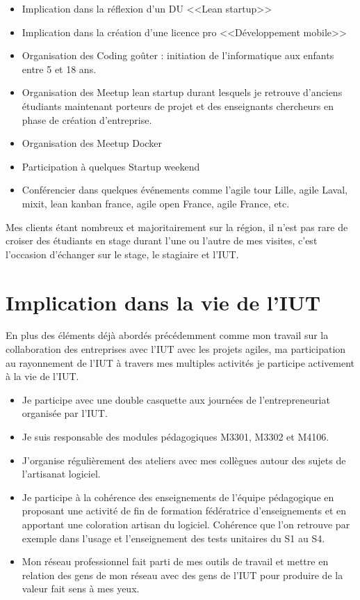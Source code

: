 \documentclass[a4paper]{article}
\begin{document}
\begin{itemize}
  \item Implication dans la réflexion d'un DU <<Lean startup>>
  \item Implication dans la création d'une licence pro <<Développement mobile>> 
  \item Organisation des Coding goûter : initiation de l'informatique aux enfants entre 5 et 18 ans.
  \item Organisation des Meetup lean startup durant lesquels je retrouve d'anciens étudiants maintenant porteurs de projet et des enseignants chercheurs en phase de création d'entreprise.
  \item Organisation des Meetup Docker
  \item Participation à quelques Startup weekend
  \item Conférencier dans quelques événements comme l'agile tour Lille, agile Laval, mixit, lean kanban france, agile open France, agile France, etc.
\end{itemize}

Mes clients étant nombreux et majoritairement sur la région, il n'est pas rare de croiser des étudiants en stage durant l'une ou l'autre de mes visites, c'est l'occasion d'échanger sur le stage, le stagiaire et l'IUT.

\section{Implication dans la vie de l'IUT}

En plus des éléments déjà abordés précédemment comme mon travail sur la collaboration des entreprises avec l'IUT avec les projets agiles, ma participation au rayonnement de l'IUT à travers mes multiples activités je participe activement à la vie de l'IUT.

\begin{itemize}
  \item Je participe avec une double casquette aux journées de l'entrepreneuriat organisée par l'IUT.
  \item Je suis responsable des modules pédagogiques M3301, M3302 et M4106.
  \item J'organise régulièrement des ateliers avec mes collègues autour des sujets de l'artisanat logiciel.
  \item Je participe à la cohérence des enseignements de l'équipe pédagogique en proposant une activité de fin de formation fédératrice d'enseignements et en apportant une coloration artisan du logiciel. Cohérence que l'on retrouve par exemple dans l'usage et l'enseignement des tests unitaires du S1 au S4.
  \item Mon réseau professionnel fait parti de mes outils de travail et mettre en relation des gens de mon réseau avec des gens de l'IUT pour produire de la valeur fait sens à mes yeux.
\end{itemize}
\end{document}
